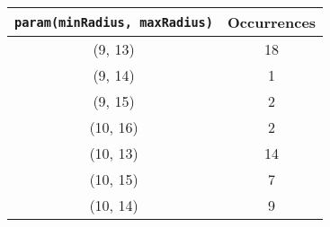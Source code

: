 \documentclass[letterpaper, 12pt]{article}
\begin{document}
\begin{longtable}{|c|c|}
\hline
\textbf{\texttt{param(minRadius, maxRadius)}} & \textbf{Occurrences} \\
\hline
(9, 13) & 18 \\
\hline
(9, 14) & 1 \\
\hline
(9, 15) & 2 \\
\hline
(10, 16) & 2 \\
\hline
(10, 13) & 14 \\
\hline
(10, 15) & 7 \\
\hline
(10, 14) & 9 \\
\hline
\end{longtable}
\end{document}
